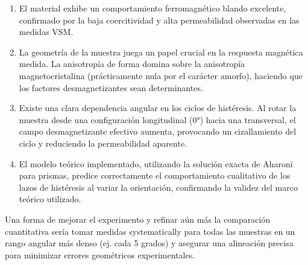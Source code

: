 \begin{enumerate}
    \item El material exhibe un comportamiento ferromagnético blando excelente, confirmado por la baja coercitividad y alta permeabilidad observadas en las medidas VSM.
    \item La geometría de la muestra juega un papel crucial en la respuesta magnética medida. La anisotropía de forma domina sobre la anisotropía magnetocristalina (prácticamente nula por el carácter amorfo), haciendo que los factores desmagnetizantes sean determinantes.
    \item Existe una clara dependencia angular en los ciclos de histéresis. Al rotar la muestra desde una configuración longitudinal (0°) hacia una transversal, el campo desmagnetizante efectivo aumenta, provocando un cizallamiento del ciclo y reduciendo la permeabilidad aparente.
    \item El modelo teórico implementado, utilizando la solución exacta de Aharoni para prismas, predice correctamente el comportamiento cualitativo de los lazos de histéresis al variar la orientación, confirmando la validez del marco teórico utilizado.
\end{enumerate}

Una forma de mejorar el experimento y refinar aún más la comparación cuantitativa sería tomar medidas systematically para todas las muestras en un rango angular más denso (ej. cada 5 grados) y asegurar una alineación precisa para minimizar errores geométricos experimentales. 



\balance

